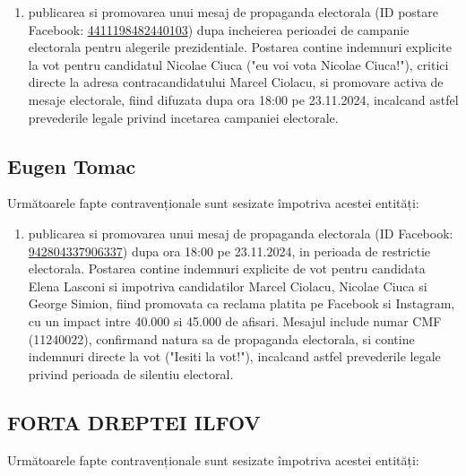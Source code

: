 \documentclass[a4paper,12pt]{article}
\begin{document}
\begin{enumerate}[leftmargin=*, label=\arabic*.)]
    \item publicarea si promovarea unui mesaj de propaganda electorala (ID postare Facebook: \href{https://www.facebook.com/ads/library/?id=4411198482440103}{4411198482440103}) dupa incheierea perioadei de campanie electorala pentru alegerile prezidentiale. Postarea contine indemnuri explicite la vot pentru candidatul Nicolae Ciuca ("eu voi vota Nicolae Ciuca!"), critici directe la adresa contracandidatului Marcel Ciolacu, si promovare activa de mesaje electorale, fiind difuzata dupa ora 18:00 pe 23.11.2024, incalcand astfel prevederile legale privind incetarea campaniei electorale.
\end{enumerate}

\vspace{0.5cm}

\subsection{Eugen Tomac}
Următoarele fapte contravenționale sunt sesizate împotriva acestei entități:

\begin{enumerate}[leftmargin=*, label=\arabic*.)]
    \item publicarea si promovarea unui mesaj de propaganda electorala (ID Facebook: \href{https://www.facebook.com/ads/library/?id=942804337906337}{942804337906337}) dupa ora 18:00 pe 23.11.2024, in perioada de restrictie electorala. Postarea contine indemnuri explicite de vot pentru candidata Elena Lasconi si impotriva candidatilor Marcel Ciolacu, Nicolae Ciuca si George Simion, fiind promovata ca reclama platita pe Facebook si Instagram, cu un impact intre 40.000 si 45.000 de afisari. Mesajul include numar CMF (11240022), confirmand natura sa de propaganda electorala, si contine indemnuri directe la vot ("Iesiti la vot!"), incalcand astfel prevederile legale privind perioada de silentiu electoral.
\end{enumerate}

\vspace{0.5cm}

\subsection{FORTA DREPTEI ILFOV}
Următoarele fapte contravenționale sunt sesizate împotriva acestei entități:
\end{document}

